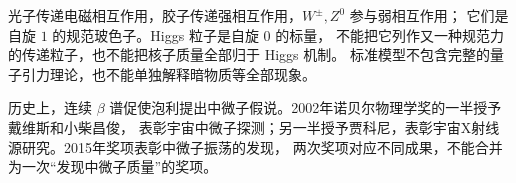 光子传递电磁相互作用，胶子传递强相互作用，$W^\pm,Z^0$ 参与弱相互作用；
它们是自旋 $1$ 的规范玻色子。Higgs 粒子是自旋 $0$ 的标量，
不能把它列作又一种规范力的传递粒子，也不能把核子质量全部归于 Higgs 机制。
标准模型不包含完整的量子引力理论，也不能单独解释暗物质等全部现象。

历史上，连续 $\beta$ 谱促使泡利提出中微子假说。2002年诺贝尔物理学奖的一半授予戴维斯和小柴昌俊，
表彰宇宙中微子探测；另一半授予贾科尼，表彰宇宙X射线源研究。2015年奖项表彰中微子振荡的发现，
两次奖项对应不同成果，不能合并为一次“发现中微子质量”的奖项。

